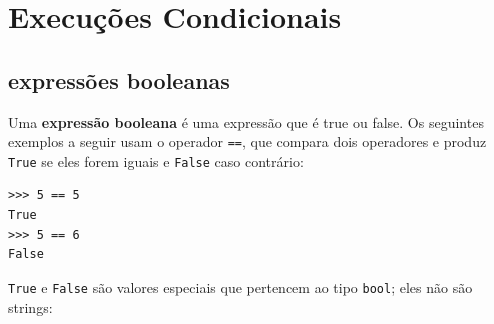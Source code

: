 
\chapter{Execuções Condicionais}

\section{expressões booleanas}





Uma {\bf expressão booleana} é uma expressão que é true 
ou false.  Os seguintes exemplos a seguir usam o 
operador {\tt ==}, que compara dois operadores e produz
{\tt True} se eles forem iguais e {\tt False} caso contrário:


\beforeverb
\begin{verbatim}
>>> 5 == 5
True
>>> 5 == 6
False
\end{verbatim}
\afterverb
%

{\tt True} e {\tt False} são valores
especiais que pertencem ao tipo {\tt bool}; eles não são strings:



